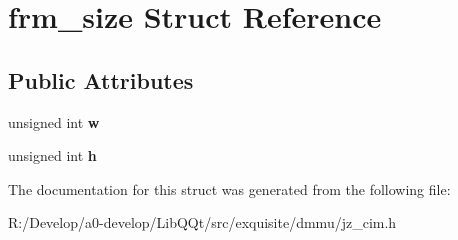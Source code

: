 \hypertarget{structfrm__size}{}\section{frm\+\_\+size Struct Reference}
\label{structfrm__size}
\subsection*{Public Attributes}
\begin{DoxyCompactItemize}
\item 
\mbox{\label{structfrm__size_ae3dbb64a7d3eda69c9b78c5a5a604293}} 
unsigned int {\bfseries w}
\item 
\mbox{\label{structfrm__size_a8cb9bb72c36090dc9d0d337b1993930b}} 
unsigned int {\bfseries h}
\end{DoxyCompactItemize}


The documentation for this struct was generated from the following file\+:\begin{DoxyCompactItemize}
\item 
R\+:/\+Develop/a0-\/develop/\+Lib\+Q\+Qt/src/exquisite/dmmu/jz\+\_\+cim.\+h\end{DoxyCompactItemize}
